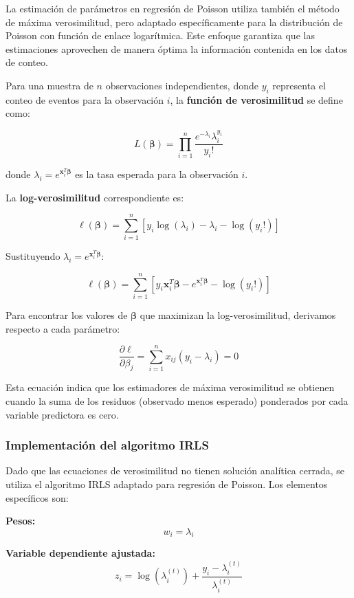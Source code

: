 \documentclass[
  letterpaper,
  DIV=11,
  numbers=noendperiod]{scrreprt}
\begin{document}
La estimación de parámetros en regresión de Poisson utiliza también el
método de máxima verosimilitud, pero adaptado específicamente para la
distribución de Poisson con función de enlace logarítmica. Este enfoque
garantiza que las estimaciones aprovechen de manera óptima la
información contenida en los datos de conteo.

Para una muestra de \(n\) observaciones independientes, donde \(y_i\)
representa el conteo de eventos para la observación \(i\), la
\textbf{función de verosimilitud} se define como:

\[L(\boldsymbol{\beta}) = \prod_{i=1}^{n} \frac{e^{-\lambda_i} \lambda_i^{y_i}}{y_i!}\]

donde \(\lambda_i = e^{\mathbf{x}_i^T\boldsymbol{\beta}}\) es la tasa
esperada para la observación \(i\).

La \textbf{log-verosimilitud} correspondiente es:

\[\ell(\boldsymbol{\beta}) = \sum_{i=1}^{n} \left[y_i \log(\lambda_i) - \lambda_i - \log(y_i!)\right]\]

Sustituyendo \(\lambda_i = e^{\mathbf{x}_i^T\boldsymbol{\beta}}\):

\[\ell(\boldsymbol{\beta}) = \sum_{i=1}^{n} \left[y_i \mathbf{x}_i^T\boldsymbol{\beta} - e^{\mathbf{x}_i^T\boldsymbol{\beta}} - \log(y_i!)\right]\]

Para encontrar los valores de \(\boldsymbol{\beta}\) que maximizan la
log-verosimilitud, derivamos respecto a cada parámetro:

\[\frac{\partial \ell}{\partial \beta_j} = \sum_{i=1}^{n} x_{ij}(y_i - \lambda_i) = 0\]

Esta ecuación indica que los estimadores de máxima verosimilitud se
obtienen cuando la suma de los residuos (observado menos esperado)
ponderados por cada variable predictora es cero.

\subsubsection{Implementación del algoritmo
IRLS}\label{implementaciuxf3n-del-algoritmo-irls-1}

Dado que las ecuaciones de verosimilitud no tienen solución analítica
cerrada, se utiliza el algoritmo IRLS adaptado para regresión de
Poisson. Los elementos específicos son:

\textbf{Pesos:} \[w_i = \lambda_i\]

\textbf{Variable dependiente ajustada:}
\[z_i = \log(\lambda_i^{(t)}) + \frac{y_i - \lambda_i^{(t)}}{\lambda_i^{(t)}}\]
\end{document}

